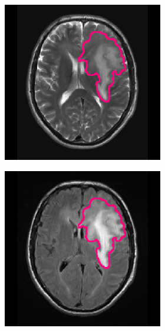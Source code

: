 \begin{subappendices}
\begin{figure}[htbp]
\begin{subfigure}[b]{0.8\textwidth}
\begin{subfigure}[b]{0.215\textwidth}
        \end{subfigure}
        \hfill
        \begin{subfigure}[b]{0.215\textwidth}
        \includegraphics[width=\textwidth, clip, trim=2.5cm 0.5cm 2.5cm 0.5cm]{Figures/Random_segs/T2_TCGA-HT-8106.png}
        \end{subfigure}
        \hfill
        \begin{subfigure}[b]{0.215\textwidth}
        \includegraphics[width=\textwidth, clip, trim=2.5cm 0.5cm 2.5cm 0.5cm]{Figures/Random_segs/FLAIR_TCGA-HT-8106.png}

\end{subfigure}
\end{subfigure}
\end{figure}
\end{subappendices}
